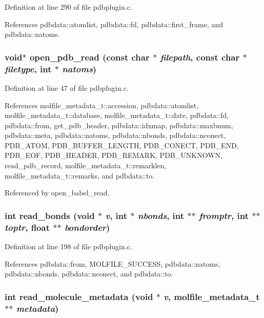Definition at line 290 of file pdbplugin.c.

References pdbdata::atomlist, pdbdata::fd, pdbdata::first\_\-frame, and pdbdata::natoms.
\subsubsection{\setlength{\rightskip}{0pt plus 5cm}void$\ast$ open\_\-pdb\_\-read (const char $\ast$ {\em filepath}, const char $\ast$ {\em filetype}, int $\ast$ {\em natoms})\hspace{0.3cm}{\tt  [static]}}\label{pdbplugin_8c_a2}




Definition at line 47 of file pdbplugin.c.

References molfile\_\-metadata\_\-t::accession, pdbdata::atomlist, molfile\_\-metadata\_\-t::database, molfile\_\-metadata\_\-t::date, pdbdata::fd, pdbdata::from, get\_\-pdb\_\-header, pdbdata::idxmap, pdbdata::maxbnum, pdbdata::meta, pdbdata::natoms, pdbdata::nbonds, pdbdata::nconect, PDB\_\-ATOM, PDB\_\-BUFFER\_\-LENGTH, PDB\_\-CONECT, PDB\_\-END, PDB\_\-EOF, PDB\_\-HEADER, PDB\_\-REMARK, PDB\_\-UNKNOWN, read\_\-pdb\_\-record, molfile\_\-metadata\_\-t::remarklen, molfile\_\-metadata\_\-t::remarks, and pdbdata::to.

Referenced by open\_\-babel\_\-read.
\subsubsection{\setlength{\rightskip}{0pt plus 5cm}int read\_\-bonds (void $\ast$ {\em v}, int $\ast$ {\em nbonds}, int $\ast$$\ast$ {\em fromptr}, int $\ast$$\ast$ {\em toptr}, float $\ast$$\ast$ {\em bondorder})\hspace{0.3cm}{\tt  [static]}}\label{pdbplugin_8c_a4}




Definition at line 198 of file pdbplugin.c.

References pdbdata::from, MOLFILE\_\-SUCCESS, pdbdata::natoms, pdbdata::nbonds, pdbdata::nconect, and pdbdata::to.
\subsubsection{\setlength{\rightskip}{0pt plus 5cm}int read\_\-molecule\_\-metadata (void $\ast$ {\em v}, {\bf molfile\_\-metadata\_\-t} $\ast$$\ast$ {\em metadata})\hspace{0.3cm}{\tt  [static]}}\label{pdbplugin_8c_a12}




